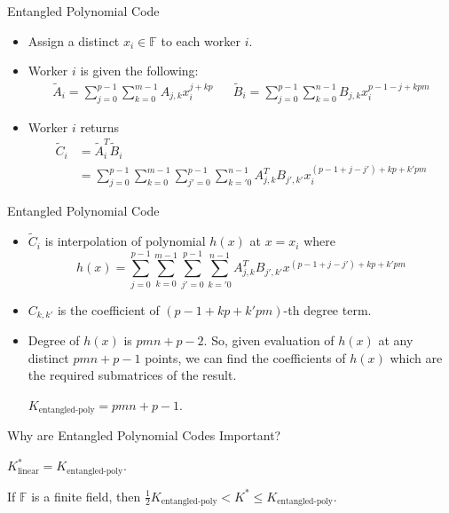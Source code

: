 \documentclass{beamer}
\begin{document}
\begin{frame}{Entangled Polynomial Code}
    \begin{itemize}
        \item Assign a distinct $x_i\in\mathbb{F}$ to each worker $i$.
        \item Worker $i$ is given the following:
        \begin{align*}
            \tilde{A}_i = \sum_{j=0}^{p-1}\sum_{k=0}^{m-1}A_{j,k}x^{j+kp}_i && \tilde{B}_i = \sum_{j=0}^{p-1}\sum_{k=0}^{n-1}B_{j,k}x^{p-1-j+kpm}_i
        \end{align*}
        \item Worker $i$ returns 
        \begin{align*}
        \tilde{C}_i &= \tilde{A}_i^{T} \tilde{B}_i \\
        &= \sum_{j=0}^{p-1} \sum_{k=0}^{m-1} \sum_{j'=0}^{p-1} \sum_{k='0}^{n-1} A_{j,k}^{T} B_{j',k'} x_{i}^{(p-1 + j - j') + kp + k'pm}
        \end{align*}
    \end{itemize}
\end{frame}

\begin{frame}{Entangled Polynomial Code}
    \begin{itemize}
        \item $\tilde{C}_{i}$ is interpolation of polynomial $h(x)$ at $x = x_{i}$ where
        \[ h(x) = \sum_{j=0}^{p-1} \sum_{k=0}^{m-1} \sum_{j'=0}^{p-1} \sum_{k='0}^{n-1} A_{j,k}^{T} B_{j',k'} x^{(p-1 + j - j') + kp + k'pm} \]
        \item $C_{k, k'}$ is the coefficient of $(p - 1 + kp + k'pm)$-th degree term.
        \item Degree of $h(x)$ is $pmn + p - 2$. So, given evaluation of $h(x)$ at any distinct $pmn + p - 1$ points, we can find the coefficients of $h(x)$ which are the required submatrices of the result.
        \begin{theorem}
            $K_{\text{entangled-poly}} = pmn + p - 1$.
        \end{theorem}
    \end{itemize}
\end{frame}

\begin{frame}{Why are Entangled Polynomial Codes Important?}
    \begin{theorem}
        $K^*_{\text{linear}} = K_{\text{entangled-poly}}$.
    \end{theorem}

    \begin{theorem}
        If $\mathbb{F}$ is a finite field, then $\frac{1}{2}K_{\text{entangled-poly}} < K^* \leq K_{\text{entangled-poly}}$.
    \end{theorem}
\end{frame}
\end{document}
